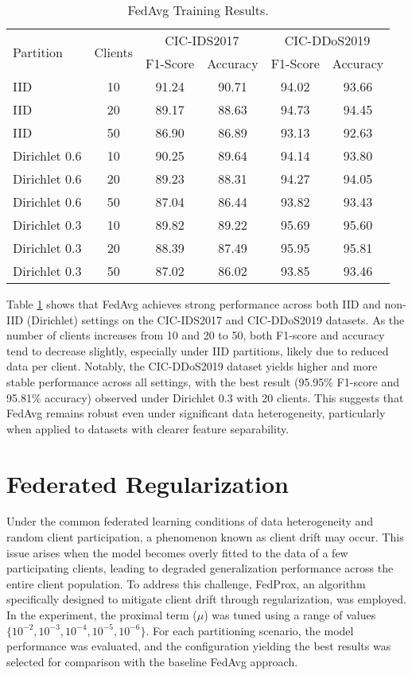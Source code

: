 \begin{table}[h]
    \caption{FedAvg Training Results.}
    \centering
    \begin{tabular}{l|c|c|c|c|c}
        \multirow{2}{*}{Partition} & \multirow{2}{*}{Clients} & \multicolumn{2}{|c|}{CIC-IDS2017} & \multicolumn{2}{|c}{CIC-DDoS2019} \\
        \cline{3-6} & & F1-Score & Accuracy & F1-Score & Accuracy \\
        \hline\hline
        IID & 10 & 91.24 & 90.71 & 94.02 & 93.66 \\
        IID & 20 & 89.17 & 88.63 & 94.73 & 94.45 \\
        IID & 50 & 86.90 & 86.89 & 93.13 & 92.63 \\
        Dirichlet 0.6 & 10 & 90.25 & 89.64 & 94.14 & 93.80 \\
        Dirichlet 0.6 & 20 & 89.23 & 88.31 & 94.27 & 94.05 \\
        Dirichlet 0.6 & 50 & 87.04 & 86.44 & 93.82 & 93.43 \\
        Dirichlet 0.3 & 10 & 89.82 & 89.22 & 95.69 & 95.60 \\
        Dirichlet 0.3 & 20 & 88.39 & 87.49 & 95.95 & 95.81 \\
        Dirichlet 0.3 & 50 & 87.02 & 86.02 & 93.85 & 93.46 \\
    \end{tabular}
    \label{tbl:fedavg_results}
\end{table}

Table \ref{tbl:fedavg_results} shows that FedAvg achieves strong performance across both IID and non-IID (Dirichlet) settings on the CIC-IDS2017 and CIC-DDoS2019 datasets. As the number of clients increases from 10 and 20 to 50, both F1-score and accuracy tend to decrease slightly, especially under IID partitions, likely due to reduced data per client. Notably, the CIC-DDoS2019 dataset yields higher and more stable performance across all settings, with the best result (95.95\% F1-score and 95.81\% accuracy) observed under Dirichlet 0.3 with 20 clients. This suggests that FedAvg remains robust even under significant data heterogeneity, particularly when applied to datasets with clearer feature separability.

\section{Federated Regularization}

Under the common federated learning conditions of data heterogeneity and random client participation, a phenomenon known as client drift may occur. This issue arises when the model becomes overly fitted to the data of a few participating clients, leading to degraded generalization performance across the entire client population. To address this challenge, FedProx, an algorithm specifically designed to mitigate client drift through regularization, was employed. In the experiment, the proximal term ($\mu$) was tuned using a range of values $\{10^{-2}, 10^{-3}, 10^{-4}, 10^{-5}, 10^{-6}\}$. For each partitioning scenario, the model performance was evaluated, and the configuration yielding the best results was selected for comparison with the baseline FedAvg approach.

